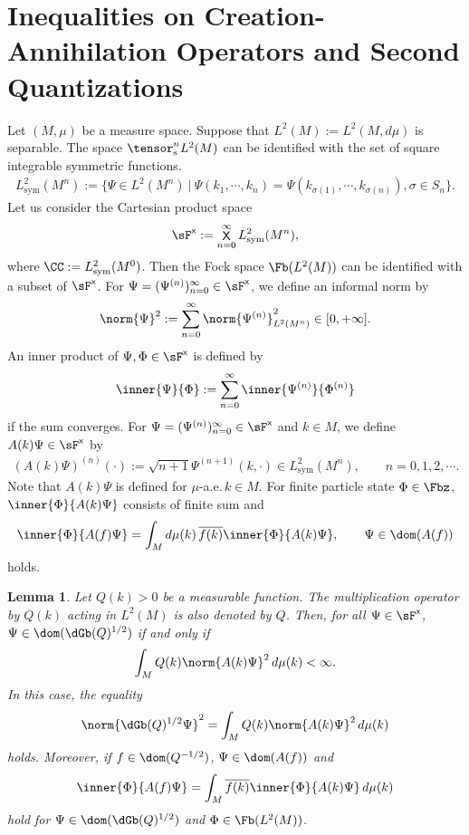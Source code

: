 \documentclass[12pt,draft]{article}
\theoremstyle{plain}
\newtheorem{lem}[theorem]{\bf Lemma}
\numberwithin{equation}{section}
\theoremstyle{remark}
\begin{document}
\section{Inequalities on Creation-Annihilation Operators and Second Quantizations}
Let $(M,\mu)$ be a measure space. 
Suppose that $L^2(M):=L^2(M,d\mu)$ is separable.
The space $\tensor_\mathrm{s}^nL^2(M)$ can be identified with the set of square integrable symmetric functions.
\begin{align*}
L^2_\mathrm{sym}(M^n)
:= \big\{\Psi \in L^2(M^n) ~\big|~ \Psi(k_1,\cdots,k_n)=\Psi(k_{\sigma(1)},\cdots,k_{\sigma(n)}), \sigma\in S_n\big\}.
\end{align*}
Let us consider the Cartesian product space
\begin{align*}
  \sF^\mathsf{x} := \mathop{\mathsf{X}}_{n=0}^\infty L^2_\mathrm{sym}(M^n),
\end{align*}
where $\CC:=L^2_\mathrm{sym}(M^0)$.
Then the Fock space $\Fb(L^2(M))$ can be identified with a subset of $\sF^\mathsf{x}$.
For $\Psi=(\Psi^{(n)})_{n=0}^\infty \in \sF^\mathsf{x}$, we define an informal norm by
\begin{align*}
  \norm{\Psi}^2 := \sum_{n=0}^\infty \norm{\Psi^{(n)}}_{L^2(M^n)}^2 \in [0,+\infty].
\end{align*}
An inner product of $\Psi,\Phi \in \sF^\mathsf{x}$ is defined by
\begin{align*}
  \inner{\Psi}{\Phi} := \sum_{n=0}^\infty \inner{\Psi^{(n)}}{\Phi^{(n)}}
\end{align*}
if the sum converges.
For $\Psi = (\Psi^{(n)})_{n=0}^\infty \in \sF^\mathsf{x}$ and $k\in M$, we define
$A(k)\Psi \in \sF^\mathsf{x}$ by
\begin{align}
 (A(k)\Psi)^{(n)}(\cdot) := \sqrt{n+1}\Psi^{(n+1)}(k,\cdot) \in L^2_\mathrm{sym}(M^n),
 \qquad n=0,1,2,\cdots.  \label{defAk}
\end{align}
Note that $A(k)\Psi$ is defined for $\mu$-a.e.\,$k\in M$.
For finite particle state $\Phi \in \Fbz$, $\inner{\Phi}{A(k)\Psi}$ consists of 
finite sum and 
\begin{align*}
  \inner{\Phi}{A(f)\Psi} = \int_Md\mu(k)\,\overline{f(k)}\inner{\Phi}{A(k)\Psi},
 \qquad \Psi\in\dom(A(f))
\end{align*}
holds.
\begin{lem}{\label{ak1}}
 Let $Q(k)>0$ be a measurable function. 
The multiplication operator by $Q(k)$ acting in $L^2(M)$ is also denoted by $Q$.
Then, for all $\Psi\in\sF^\mathsf{x}$, 
$\Psi\in\dom(\dGb(Q)^{1/2})$ if and only if
\begin{align*}
  \int_M Q(k)\norm{A(k)\Psi}^2 \,d\mu(k) < \infty.
\end{align*}
In this case, the equality
\begin{align*}
  \norm{\dGb(Q)^{1/2}\Psi}^2 = \int_M Q(k)\norm{A(k)\Psi}^2 \,d\mu(k) 
\end{align*}
holds. Moreover, if $f\in\dom(Q^{-1/2})$, $\Psi\in\dom(A(f))$ and 
\begin{align*}
  \inner{\Phi}{A(f)\Psi} = \int_M \overline{f(k)}\inner{\Phi}{A(k)\Psi} \,d\mu(k)
\end{align*}
hold for $\Psi\in\dom(\dGb(Q)^{1/2})$ and $\Phi\in\Fb(L^2(M))$.
\end{lem}
\end{document}
